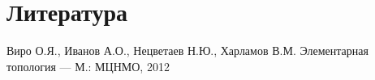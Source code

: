 \section{Литература}

\begin{thebibliography}{99}

 Виро О.Я., Иванов А.О., Нецветаев Н.Ю., Харламов В.М. Элементарная топология --- М.: МЦНМО, 2012









\end{thebibliography}